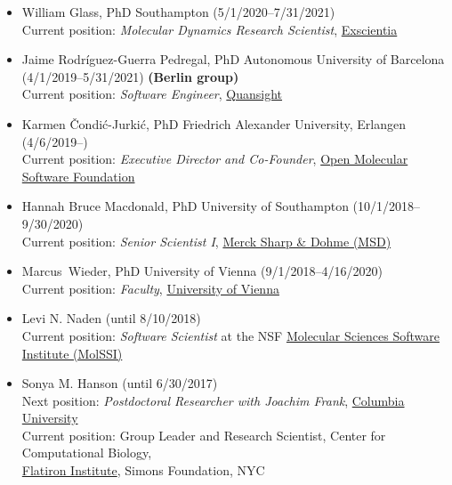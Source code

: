 \documentclass[10pt]{article}
\begin{document}
\begin{itemize}
  \item William Glass, PhD Southampton (5/1/2020--7/31/2021) \\
  Current position: \emph{Molecular Dynamics Research Scientist}, \href{https://www.exscientia.ai/}{Exscientia}

  \item Jaime Rodr\'{i}guez-Guerra Pedregal, PhD Autonomous University of Barcelona (4/1/2019--5/31/2021) {\bf (Berlin group)}\\
  Current position: \emph{Software Engineer}, \href{https://quansight.com/}{Quansight}

  \item Karmen \v{C}ondi\'{c}-Jurki\'{c}, PhD Friedrich Alexander University, Erlangen (4/6/2019--)\\
  Current position: \emph{Executive Director and Co-Founder}, \href{http://omsf.io}{Open Molecular Software Foundation}

  \item Hannah Bruce Macdonald, PhD University of Southampton (10/1/2018--9/30/2020)\\
  Current position: \emph{Senior Scientist I}, \href{http://www.merck.com}{Merck Sharp \& Dohme (MSD)}
  
  \item Marcus~Wieder, PhD University of Vienna (9/1/2018--4/16/2020)\\
  Current position: \emph{Faculty}, \href{https://www.univie.ac.at/en/}{University of Vienna}
  
  \item Levi N. Naden (until 8/10/2018)\\
  Current position: \emph{Software Scientist} at the NSF \href{http://molssi.org}{Molecular Sciences Software Institute (MolSSI)}
  
  \item Sonya M. Hanson (until 6/30/2017)\\
  Next position: \emph{Postdoctoral Researcher with Joachim Frank}, \href{http://franklab.cpmc.columbia.edu/franklab/}{{Columbia University}}\\
  Current position: Group Leader and Research Scientist, Center for Computational Biology, \\ \href{https://www.simonsfoundation.org/flatiron/}{Flatiron Institute}, Simons Foundation, NYC
 

\end{itemize}
\end{document}
